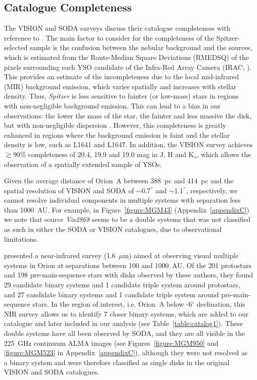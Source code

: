 \documentclass{aa}
\begin{document}
\subsection{Catalogue Completeness}

The VISION and SODA surveys discuss their catalogue completeness with reference to \cite{Megeath16}. The main factor to consider for the completeness of the Spitzer-selected sample is the confusion between the nebular background and the sources, which is estimated from the Route-Median Square Deviations (RMEDSQ) of the pixels surrounding each YSO candidate of the Infra-Red Array Camera (IRAC, \cite{Fazio04}). This provides an estimate of the incompleteness due to the local mid-infrared (MIR) background emission, which varies spatially and increases with stellar density. Thus, \textit{Spitzer} is less sensitive to fainter (or low-mass) stars in regions with non-negligible background emission. This can lead to a bias in our observations: the lower the mass of the star, the fainter and less massive the disk, but with non-negligible dispersion \citep[e.g.,][]{Ansdell16, Pascucci16}. However, this completeness is greatly enhanced in regions where the background emission is faint and the stellar density is low, such as L1641 and L1647. In addition, the VISION survey achieves $\gtrsim$90$\%$ completeness of 20.4, 19.9 and 19.0 mag in J, H and K$_s$, which allows the observation of a spatially extended sample of YSOs. \par
Given the average distance of Orion~A between 388~pc and 414~pc \citep{Grosschedl18_3D} and the spatial resolution of VISION and SODA of $\sim$0.7$^{''}$ and $\sim$1.1$^{''}$, respectively, we cannot resolve individual components in multiple systems with separation less than 1000~AU. For example, in Figure~\ref{figure:MGM43} (Appendix~\ref{appendixC}) we note that source \textit{Vis2868} seems to be a double systems that was not classified as such in either the SODA or VISION catalogues, due to observational limitations. \par
\cite{Kounkel16} presented a near-infrared survey (1.6~$\mu$m) aimed at observing visual multiple systems in Orion at separations between 100 and 1000~AU. Of the 201 protostars and 198 pre-main-sequence stars with disks observed by these authors, they found 29 candidate binary systems and 1 candidate triple system around protostars, and 27 candidate binary systems and 1 candidate triple system around pre-main-sequence stars. In the region of interest, i.e. Orion~A below -6$^{\circ}$ declination, this NIR survey allows us to identify 7 closer binary systems, which are added to our catalogue and later included in our analysis (see Table~\ref{table:catalog1}). These double systems have all been observed by SODA, and they are all visible in the 225~GHz continuum ALMA images (see Figures~\ref{figure:MGM950} and \ref{figure:MGM523} in Appendix~\ref{appendixC}), although they were not resolved as a binary system and were therefore classified as single disks in the original VISION and SODA catalogues.
\end{document}

